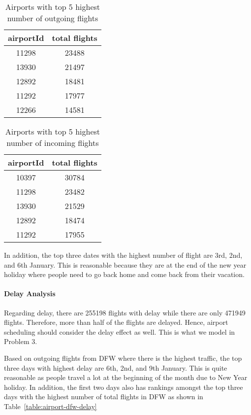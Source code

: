 \documentclass[11pt,a4paper]{article}
\begin{document}
\begin{table}
\caption{Airports with top 5 highest number of outgoing flights}
\centering
\begin{tabular}{| c | c |}
\hline
airportId & total flights \\
\hline
11298&23488 \\
13930&21497 \\
12892&18481 \\
11292&17977 \\
12266&14581 \\
\hline
\end{tabular}
\label{fig:airport-flight-out}
\end{table}

\begin{table}
\caption{Airports with top 5 highest number of incoming flights}
\centering
\begin{tabular}{| c | c |}
\hline
airportId & total flights \\
\hline
10397&30784 \\
11298&23482 \\
13930&21529 \\
12892&18474 \\
11292&17955 \\
\hline
\end{tabular}
\label{fig:airport-flight-in}
\end{table}

In addition, the top three dates with the highest number of flight are 3rd, 2nd, and 6th January. This is reasonable because they are at the end of the new year holiday where people need to go back home and come back from their vacation.

\paragraph{Delay Analysis}
Regarding delay, there are 255198 flights with delay while there are only 471949 flights. Therefore, more than half of the flights are delayed. Hence, airport scheduling should consider the delay effect as well. This is what we model in Problem 3. \par
Based on outgoing flights from DFW where there is the highest traffic, the top three days with highest delay are 6th, 2nd, and 9th January. This is quite reasonable as people travel a lot at the beginning of the month due to New Year holiday. In addition, the first two days also has rankings amongst the top three days with the highest number of total flights in DFW as shown in Table~\ref{table:airport-dfw-delay}
\end{document}
